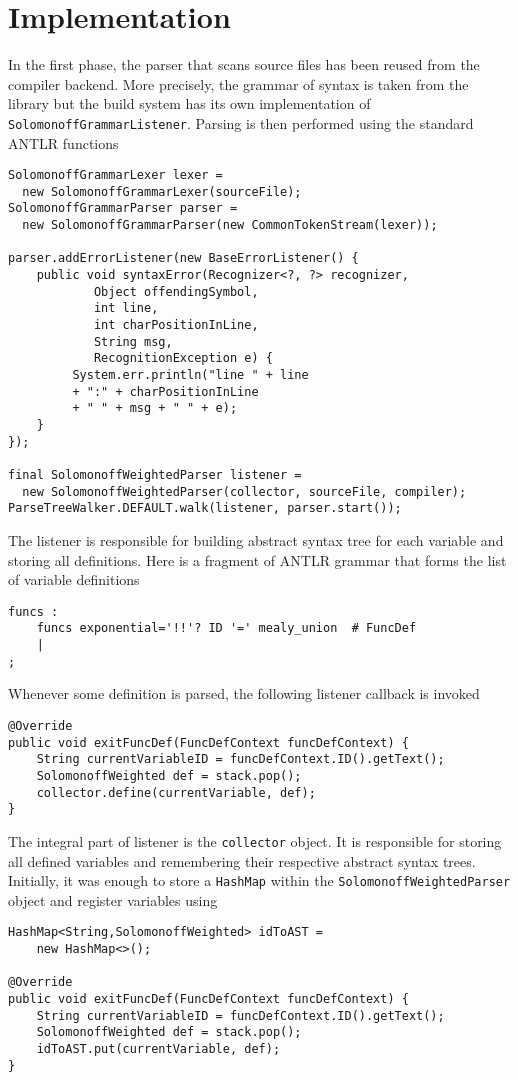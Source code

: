 \section{Implementation}

In the first phase, the parser that scans source files has been reused from the compiler backend. More precisely, the grammar of syntax is taken from the library but the build system has its own implementation of \texttt{SolomonoffGrammarListener}. Parsing is then performed using the standard ANTLR functions
\begin{lstlisting}
SolomonoffGrammarLexer lexer =
  new SolomonoffGrammarLexer(sourceFile);
SolomonoffGrammarParser parser =
  new SolomonoffGrammarParser(new CommonTokenStream(lexer));

parser.addErrorListener(new BaseErrorListener() {
    public void syntaxError(Recognizer<?, ?> recognizer, 
            Object offendingSymbol, 
            int line,
            int charPositionInLine, 
            String msg, 
            RecognitionException e) {
         System.err.println("line " + line 
         + ":" + charPositionInLine 
         + " " + msg + " " + e);
    }
});

final SolomonoffWeightedParser listener =
  new SolomonoffWeightedParser(collector, sourceFile, compiler);
ParseTreeWalker.DEFAULT.walk(listener, parser.start());
\end{lstlisting}
The listener is responsible for building abstract syntax tree for each variable and storing all definitions. Here is a fragment of ANTLR grammar that forms the list of variable definitions 
\begin{lstlisting}
funcs :
    funcs exponential='!!'? ID '=' mealy_union  # FuncDef
    | 
;
\end{lstlisting} 
Whenever some definition is parsed, the following listener callback is invoked
\begin{lstlisting}
@Override
public void exitFuncDef(FuncDefContext funcDefContext) {
    String currentVariableID = funcDefContext.ID().getText();
    SolomonoffWeighted def = stack.pop();
    collector.define(currentVariable, def);
}
\end{lstlisting}
The integral part of listener is the \texttt{collector} object. It is responsible for storing all defined variables and remembering their respective abstract syntax trees. Initially, it was enough to store a \texttt{HashMap} within the \texttt{SolomonoffWeightedParser} object and register variables using 
\begin{lstlisting}
HashMap<String,SolomonoffWeighted> idToAST = 
    new HashMap<>();
    
@Override
public void exitFuncDef(FuncDefContext funcDefContext) {
    String currentVariableID = funcDefContext.ID().getText();
    SolomonoffWeighted def = stack.pop();
    idToAST.put(currentVariable, def);
}
\end{lstlisting}
